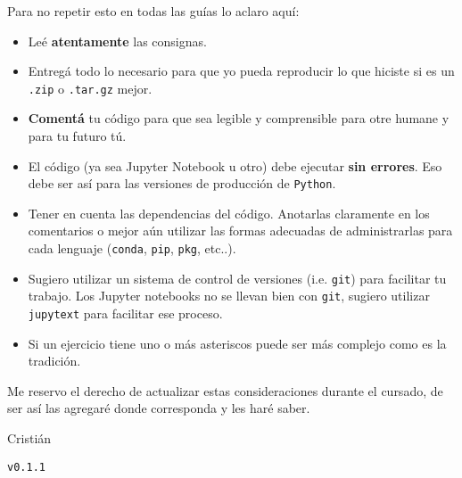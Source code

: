 \documentclass[a4paper,12pt]{article}
\begin{document}
Para no repetir esto en todas las guías lo aclaro aquí:

\begin{itemize}
    \item Leé {\bf atentamente} las consignas.
    \item Entregá todo lo necesario para que yo pueda reproducir lo que hiciste si es un {\tt .zip} o {\tt .tar.gz} mejor. 
    \item {\bf Comentá} tu código para que sea legible y comprensible para otre humane y para tu futuro tú.
    \item El código (ya sea Jupyter Notebook u otro) debe ejecutar {\bf sin errores}. Eso debe ser así para las versiones de producción de {\tt Python}.
    \item Tener en cuenta las dependencias del código. Anotarlas claramente en los comentarios o mejor aún utilizar las formas adecuadas de administrarlas para cada lenguaje ({\tt conda}, {\tt pip}, {\tt pkg}, etc..).
    \item Sugiero utilizar un sistema de control de versiones (i.e. {\tt git}) para facilitar tu trabajo. Los Jupyter notebooks no se llevan bien con {\tt git}, sugiero utilizar {\tt jupytext} para facilitar ese proceso.
    \item Si un ejercicio tiene uno o más asteriscos puede ser más complejo como es la tradición.
\end{itemize}

Me reservo el derecho de actualizar estas consideraciones durante el cursado, de ser así las agregaré donde corresponda y les haré saber.

\vspace{1cm}
\hfill Cristián

\vfill
{\tt v0.1.1}
\end{document}
